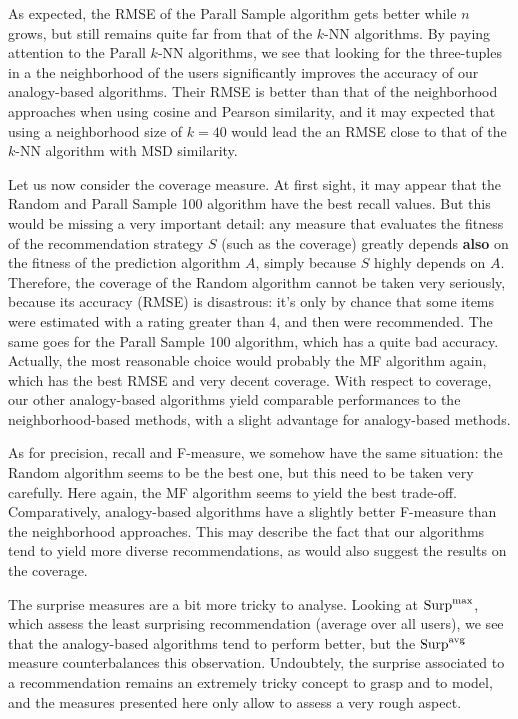 As expected, the RMSE of the
Parall Sample algorithm gets better while $n$ grows, but still
remains quite far from that of the $k$-NN algorithms. By paying attention to
the Parall $k$-NN algorithms, we see that looking for the
three-tuples in a the neighborhood of the users significantly improves the
accuracy of our analogy-based algorithms. Their RMSE is better than that of the
neighborhood approaches when using cosine and Pearson similarity, and it may
expected that using a neighborhood size of $k=40$ would lead the an RMSE close
to that of the $k$-NN algorithm with MSD similarity.

Let us now consider the coverage measure. At first sight, it may appear that
the Random and Parall Sample 100 algorithm have the best recall values. But this
would be missing a very important detail: any measure that evaluates the
fitness of the recommendation strategy $S$ (such as the coverage) greatly
depends \textbf{also} on the fitness of the prediction algorithm $A$, simply
because $S$ highly depends on $A$. Therefore, the coverage of the Random
algorithm cannot be taken very seriously, because its accuracy (RMSE) is
disastrous: it's only by chance that some items were estimated with a rating
greater than $4$, and then were recommended. The same goes for the Parall
Sample 100 algorithm, which has a quite bad accuracy.  Actually, the most
reasonable choice would probably the MF algorithm again, which has the best
RMSE and very decent coverage. With respect to coverage, our other
analogy-based algorithms yield comparable performances to the
neighborhood-based methods, with a slight advantage for analogy-based methods.

As for precision, recall and F-measure, we somehow have the same situation: the
Random algorithm seems to be the best one, but this need to be taken very
carefully. Here again, the MF algorithm seems to yield the best trade-off.
Comparatively, analogy-based algorithms have a slightly better F-measure than
the neighborhood approaches. This may describe the fact that our algorithms
tend to yield more diverse recommendations, as would also suggest the results
on the coverage.

The surprise measures are a bit more tricky to analyse. Looking at $\text{Surp}^{\text{max}}$,
which assess the least surprising recommendation (average over all users), we
see that the analogy-based algorithms tend to perform better, but the
$\text{Surp}^{\text{avg}}$ measure counterbalances this observation. Undoubtely, the surprise
associated to a recommendation remains an extremely tricky concept to grasp and
to model, and the measures presented here only allow to assess a very rough
aspect.

